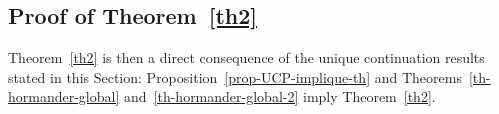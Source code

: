 \subsection{Proof of Theorem~\ref{th2}}

Theorem~\ref{th2} is then a direct consequence of the unique continuation results stated in this Section: Proposition~\ref{prop-UCP-implique-th} and Theorems~\ref{th-hormander-global} and~\ref{th-hormander-global-2} imply Theorem~\ref{th2}.



